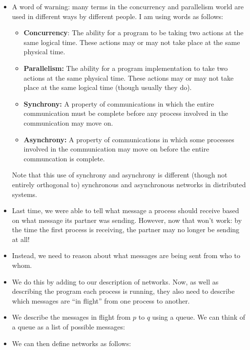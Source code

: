 \documentclass{lecturenotes}
\begin{document}
\begin{itemize}
\item A word of warning: many terms in the concurrency and parallelism world are used in different ways by different people.
  I am using words as follows:
  \begin{itemize}
  \item \textbf{Concurrency}: The ability for a program to be taking two actions at the same logical time.
    These actions may or may not take place at the same physical time.
  \item \textbf{Parallelism:} The ability for a program implementation to take two actions at the same physical time.
    These actions may or may not take place at the same logical time (though usually they do).
  \item \textbf{Synchrony:} A property of communications in which the entire communication must be complete before any process involved in the communication may move on.
  \item \textbf{Asynchrony:} A property of communications in which some processes involved in the communication may move on before the entire communcation is complete.
  \end{itemize}
  Note that this use of synchrony and asynchrony is different (though not entirely orthogonal to) synchronous and asynchronous networks in distributed systems.
\item Last time, we were able to tell what message a process should receive based on what message its partner was sending.
  However, now that won't work: by the time the first process is receiving, the partner may no longer be sending at all!
\item Instead, we need to reason about what messages are being sent from who to whom.
\item We do this by adding to our description of networks.
  Now, as well as describing the program each process is running, they also need to describe which messages are ``in flight'' from one process to another.
\item We describe the messages in flight from $p$ to $q$ using a queue.
  We can think of a queue as a list of possible messages:
  \begin{syntax}
      \alternative{[d]}
     
  \end{syntax}
\item We can then define networks as follows:
  \begin{syntax}
     

\end{syntax}
\end{itemize}
\end{document}
